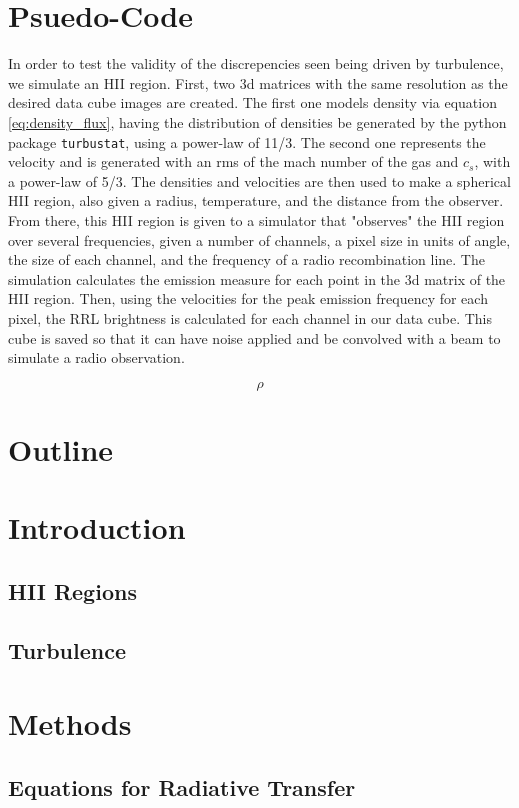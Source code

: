 \documentclass{article}
\def\code#1{\texttt{#1}}
\begin{document}
\section{Psuedo-Code}
In order to test the validity of the discrepencies seen being driven by turbulence, we simulate an HII region. First, two 3d matrices with the same resolution as the desired data cube images are created. The first one models density via equation \ref{eq:density_flux}, having the distribution of densities be generated by the python package \code{turbustat}, using a power-law of 11/3. The second one represents the velocity and is generated with an rms of the mach number of the gas and $c_s$, with a power-law of 5/3. The densities and velocities are then used to make a spherical HII region, also given a radius, temperature, and the distance from the observer. From there, this HII region is given to a simulator that "observes" the HII region over several frequencies, given a number of channels, a pixel size in units of angle, the size of each channel, and the frequency of a radio recombination line. The simulation calculates the emission measure for each point in the 3d matrix of the HII region. Then, using the velocities for the peak emission frequency for each pixel, the RRL brightness is calculated for each channel in our data cube. This cube is saved so that it can have noise applied and be convolved with a beam to simulate a radio observation.

\begin{equation}
  \rho
  \label{eq:density_flux}
\end{equation}

\section{Outline}
\section{Introduction}
\subsection{HII Regions}
\subsection{Turbulence}
\section{Methods}
\subsection{Equations for Radiative Transfer}
\end{document}
